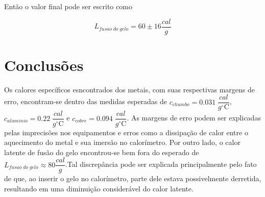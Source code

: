 \documentclass[12pt,a4paper]{article}
\begin{document}
Então o valor final pode ser escrito como

$$ L_{fusao\;do\;gelo} = 60 \pm 16 \dfrac{cal}{g}$$


\section{Conclusões}
Os calores específicos esncontrados dos metais, com suas respectivas margens de erro, encontram-se dentro das medidas esperadas de $ c_{chumbo} = 0.031 \; \dfrac{cal}{g^{\circ}\mathrm{C}}$, $ c_{aluminio} = 0.22  \; \dfrac{cal}{g^{\circ}\mathrm{C}}$ e $ c_{cobre} = 0.094\; \dfrac{cal}{g^{\circ}\mathrm{C}}$. As margens de erro podem ser explicadas pelas imprecisões nos equipamentos e erros como a dissipação de calor entre o aquecimento do metal e sua imersão no calorímetro.
Por outro lado, o calor latente de fusão do gelo encontrou-se bem fora do esperado de $ L_{fusao\;do\;gelo} \approx 80 \dfrac{cal}{g}$.Tal discrepância pode ser explicada principalmente pelo fato de que, ao inserir o gelo no calorímetro, parte dele estava possivelmente derretida, resultando em uma diminuição considerável do calor latente.
\end{document}
